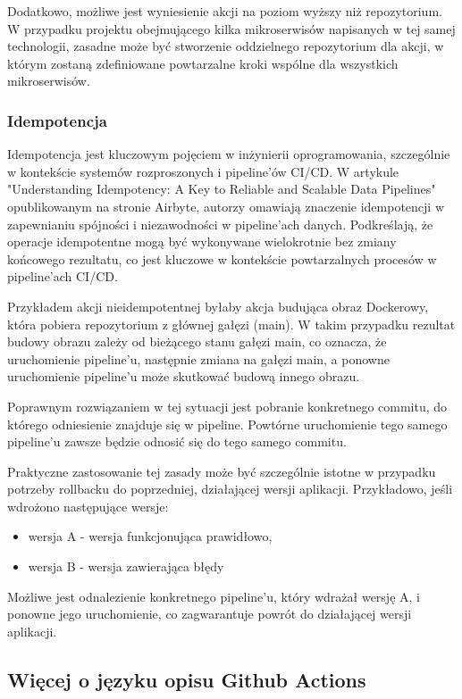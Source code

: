 \documentclass{article}
\begin{document}
Dodatkowo, możliwe jest wyniesienie akcji na poziom wyższy niż repozytorium. W przypadku projektu obejmującego kilka mikroserwisów napisanych w tej samej technologii, zasadne może być stworzenie oddzielnego repozytorium dla akcji, w którym zostaną zdefiniowane powtarzalne kroki wspólne dla wszystkich mikroserwisów.

\subsubsection{Idempotencja}

Idempotencja jest kluczowym pojęciem w inżynierii oprogramowania, szczególnie w kontekście systemów rozproszonych i pipeline'ów CI/CD. W artykule "Understanding Idempotency: A Key to Reliable and Scalable Data Pipelines" \cite{understandingIdempotency} opublikowanym na stronie Airbyte, autorzy omawiają znaczenie idempotencji w zapewnianiu spójności i niezawodności w pipeline'ach danych. Podkreślają, że operacje idempotentne mogą być wykonywane wielokrotnie bez zmiany końcowego rezultatu, co jest kluczowe w kontekście powtarzalnych procesów w pipeline'ach CI/CD.

Przykładem akcji nieidempotentnej byłaby akcja budująca obraz Dockerowy, która pobiera repozytorium z głównej gałęzi (main). W takim przypadku rezultat budowy obrazu zależy od bieżącego stanu gałęzi main, co oznacza, że uruchomienie pipeline’u, następnie zmiana na gałęzi main, a ponowne uruchomienie pipeline’u może skutkować budową innego obrazu.

Poprawnym rozwiązaniem w tej sytuacji jest pobranie konkretnego commitu, do którego odniesienie znajduje się w pipeline. Powtórne uruchomienie tego samego pipeline’u zawsze będzie odnosić się do tego samego commitu.

Praktyczne zastosowanie tej zasady może być szczególnie istotne w przypadku potrzeby rollbacku do poprzedniej, działającej wersji aplikacji. Przykładowo, jeśli wdrożono następujące wersje:
\begin{itemize}
    \item wersja A - wersja funkcjonująca prawidłowo,
    \item wersja B - wersja zawierająca błędy
\end{itemize}

Możliwe jest odnalezienie konkretnego pipeline’u, który wdrażał wersję A, i ponowne jego uruchomienie, co zagwarantuje powrót do działającej wersji aplikacji.

\subsection{Więcej o języku opisu Github Actions}
\end{document}
